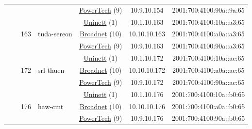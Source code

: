 \begin{small}
\begin{center}
\begin{longtable}{|c|c|c|c|c|c|c|c|}
  &  &  &  & \multicolumn{2}{|c|}{\tiny{\href{http://www.powertech.no}{PowerTech} (9)}} & \tiny{10.9.10.154} & \tiny{2001:700:4100:90a::9a:65} \\* \cline{3-3}\cline{4-4}\cline{5-5}\cline{6-6}\cline{7-7}\cline{8-8}
  &  & \multirow{3}{*}{\tiny{163}} & \multicolumn{1}{|l|}{\multirow{3}{*}{\tiny{tuda-sereon}}} & \multicolumn{2}{|c|}{\tiny{\href{https://www.uninett.no}{Uninett} (1)}} & \tiny{10.1.10.163} & \tiny{2001:700:4100:10a::a3:65} \\* \cline{5-5}\cline{6-6}\cline{7-7}\cline{8-8}
  &  &  &  & \multicolumn{2}{|c|}{\tiny{\href{https://www.broadnet.no}{Broadnet} (10)}} & \tiny{10.10.10.163} & \tiny{2001:700:4100:a0a::a3:65} \\* \cline{5-5}\cline{6-6}\cline{7-7}\cline{8-8}
  &  &  &  & \multicolumn{2}{|c|}{\tiny{\href{http://www.powertech.no}{PowerTech} (9)}} & \tiny{10.9.10.163} & \tiny{2001:700:4100:90a::a3:65} \\* \cline{3-3}\cline{4-4}\cline{5-5}\cline{6-6}\cline{7-7}\cline{8-8}
  &  & \multirow{3}{*}{\tiny{172}} & \multicolumn{1}{|l|}{\multirow{3}{*}{\tiny{srl-thuen}}} & \multicolumn{2}{|c|}{\tiny{\href{https://www.uninett.no}{Uninett} (1)}} & \tiny{10.1.10.172} & \tiny{2001:700:4100:10a::ac:65} \\* \cline{5-5}\cline{6-6}\cline{7-7}\cline{8-8}
  &  &  &  & \multicolumn{2}{|c|}{\tiny{\href{https://www.broadnet.no}{Broadnet} (10)}} & \tiny{10.10.10.172} & \tiny{2001:700:4100:a0a::ac:65} \\* \cline{5-5}\cline{6-6}\cline{7-7}\cline{8-8}
  &  &  &  & \multicolumn{2}{|c|}{\tiny{\href{http://www.powertech.no}{PowerTech} (9)}} & \tiny{10.9.10.172} & \tiny{2001:700:4100:90a::ac:65} \\* \cline{3-3}\cline{4-4}\cline{5-5}\cline{6-6}\cline{7-7}\cline{8-8}
  &  & \multirow{3}{*}{\tiny{176}} & \multicolumn{1}{|l|}{\multirow{3}{*}{\tiny{haw-cmt}}} & \multicolumn{2}{|c|}{\tiny{\href{https://www.uninett.no}{Uninett} (1)}} & \tiny{10.1.10.176} & \tiny{2001:700:4100:10a::b0:65} \\* \cline{5-5}\cline{6-6}\cline{7-7}\cline{8-8}
  &  &  &  & \multicolumn{2}{|c|}{\tiny{\href{https://www.broadnet.no}{Broadnet} (10)}} & \tiny{10.10.10.176} & \tiny{2001:700:4100:a0a::b0:65} \\* \cline{5-5}\cline{6-6}\cline{7-7}\cline{8-8}
  &  &  &  & \multicolumn{2}{|c|}{\tiny{\href{http://www.powertech.no}{PowerTech} (9)}} & \tiny{10.9.10.176} & \tiny{2001:700:4100:90a::b0:65} \\* \cline{3-3}\cline{4-4}\cline{5-5}\cline{6-6}\cline{7-7}\cline{8-8}

\end{longtable}
\end{center}
\end{small}
